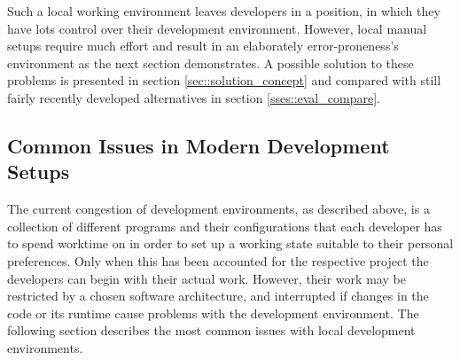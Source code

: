     Such a local working environment leaves developers in a position, in which they have lots control over their development environment. However, local manual setups require much effort and result in an elaborately error-proneness's environment as the next section demonstrates. A possible solution to these problems is presented in section \ref{sec::solution_concept} and compared with still fairly recently developed alternatives in section \ref{sses::eval_compare}.

    \subsection{Common Issues in Modern Development Setups}
    The current congestion of development environments, as described above, is a collection of different programs and their configurations that each developer has to spend worktime on in order to set up a working state suitable to their personal preferences. Only when this has been accounted for the respective project the developers can begin with their actual work. However, their work may be restricted by a chosen software architecture, and interrupted if changes in the code or its runtime cause problems with the development environment. The following section describes the most common issues with local development environments.

